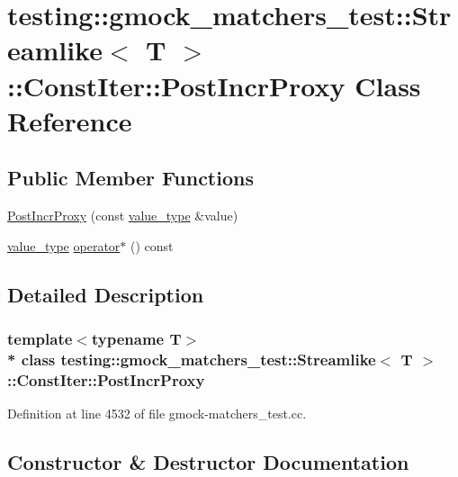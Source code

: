 \hypertarget{classtesting_1_1gmock__matchers__test_1_1_streamlike_1_1_const_iter_1_1_post_incr_proxy}{}\section{testing\+:\+:gmock\+\_\+matchers\+\_\+test\+:\+:Streamlike$<$ T $>$\+:\+:Const\+Iter\+:\+:Post\+Incr\+Proxy Class Reference}
\label{classtesting_1_1gmock__matchers__test_1_1_streamlike_1_1_const_iter_1_1_post_incr_proxy}
\subsection*{Public Member Functions}
\begin{DoxyCompactItemize}
\item 
\hyperlink{classtesting_1_1gmock__matchers__test_1_1_streamlike_1_1_const_iter_1_1_post_incr_proxy_a1915f8db9943b0a995c4e01d6120fc80}{Post\+Incr\+Proxy} (const \hyperlink{classtesting_1_1gmock__matchers__test_1_1_streamlike_a7e2c2e021676c1ed5dea63cdd019661c}{value\+\_\+type} \&value)
\item 
\hyperlink{classtesting_1_1gmock__matchers__test_1_1_streamlike_a7e2c2e021676c1ed5dea63cdd019661c}{value\+\_\+type} \hyperlink{classtesting_1_1gmock__matchers__test_1_1_streamlike_1_1_const_iter_1_1_post_incr_proxy_a0e884ebfb91740596305499fe35a7623}{operator$\ast$} () const 
\end{DoxyCompactItemize}


\subsection{Detailed Description}
\subsubsection*{template$<$typename T$>$\\*
class testing\+::gmock\+\_\+matchers\+\_\+test\+::\+Streamlike$<$ T $>$\+::\+Const\+Iter\+::\+Post\+Incr\+Proxy}



Definition at line 4532 of file gmock-\/matchers\+\_\+test.\+cc.



\subsection{Constructor \& Destructor Documentation}
